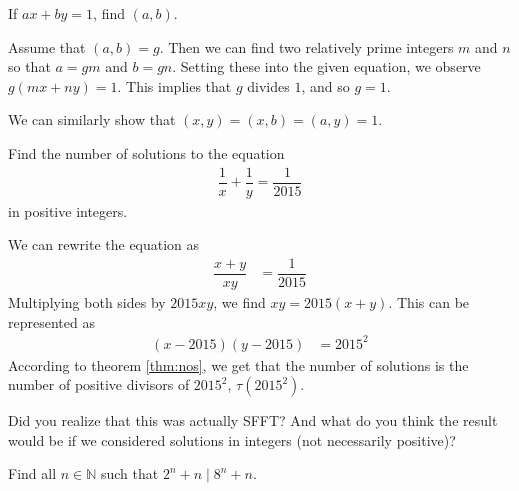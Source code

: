 	\begin{problem}
		If $ax+by=1$, find $(a,b)$.\label{prob:d1}
	\end{problem}

	\begin{solution}
		Assume that $(a,b)=g$. Then we can find two relatively prime integers $m$ and $n$ so that $a=gm$ and $b=gn$. Setting these into the given equation, we observe $g(mx+ny)=1$. This implies that $g$ divides $1$, and so $g=1$.
	\end{solution}

	\begin{note}
		We can similarly show that $(x,y)=(x,b)=(a,y)=1$.
	\end{note}

	\begin{problem}
		Find the number of solutions to the equation
		\begin{align*}
			\dfrac{1}{x}+\dfrac{1}{y}=\dfrac{1}{2015}
		\end{align*}
		in positive integers.
	\end{problem}

	\begin{solution}
		We can rewrite the equation as
			\begin{align*}
				\dfrac{x+y}{xy} & = \dfrac{1}{2015}
			\end{align*}
		Multiplying both sides by $2015xy$, we find $xy=2015(x+y)$. This can be represented as
			\begin{align*}
				(x-2015)(y-2015) & = 2015^2
			\end{align*}
		According to theorem \autoref{thm:nos}, we get that the number of solutions is the number of positive divisors of $2015^2$, $\tau(2015^2)$.
	\end{solution}

	\begin{note}
		Did you realize that this was actually SFFT? And what do you think the result would be if we considered solutions in integers (not necessarily positive)?
	\end{note}

	\begin{problem}
		Find all $n\in\mathbb{N}$ such that $2^n+n\mid 8^n+n$.
	\end{problem}

